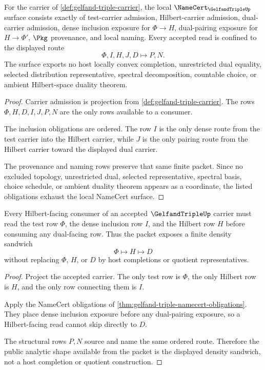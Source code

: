 \begin{theorem}
\label{thm:gelfand-triple-namecert-obligations}
For the carrier of \autoref{def:gelfand-triple-carrier}, the local $\NameCert_{\GelfandTripleUp}$ surface consists exactly of test-carrier admission, Hilbert-carrier admission, dual-carrier admission, dense inclusion exposure for $\Phi \to H$, dual-pairing exposure for $H \to \Phi'$, $\Pkg$ provenance, and local naming. Every accepted read is confined to the displayed route
$$
\Phi,I,H,J,D \longmapsto P,N .
$$
The surface exports no host locally convex completion, unrestricted dual equality, selected distribution representative, spectral decomposition, countable choice, or ambient Hilbert-space duality theorem.
\end{theorem}
\begin{proof}
Carrier admission is projection from \autoref{def:gelfand-triple-carrier}. The rows $\Phi,H,D,I,J,P,N$ are the only rows available to a consumer.

The inclusion obligations are ordered. The row $I$ is the only dense route from the test carrier into the Hilbert carrier, while $J$ is the only pairing route from the Hilbert carrier toward the displayed dual carrier.

The provenance and naming rows preserve that same finite packet. Since no excluded topology, unrestricted dual, selected representative, spectral basis, choice schedule, or ambient duality theorem appears as a coordinate, the listed obligations exhaust the local NameCert surface.
\end{proof}

\begin{theorem}
\label{thm:gelfand-triple-density-sandwich}
Every Hilbert-facing consumer of an accepted $\GelfandTripleUp$ carrier must read the test row $\Phi$, the dense inclusion row $I$, and the Hilbert row $H$ before consuming any dual-facing row. Thus the packet exposes a finite density sandwich
$$
\Phi \longmapsto H \longmapsto D
$$
without replacing $\Phi$, $H$, or $D$ by host completions or quotient representatives.
\end{theorem}
\begin{proof}
Project the accepted carrier. The only test row is $\Phi$, the only Hilbert row is $H$, and the only row connecting them is $I$.

Apply the NameCert obligations of \autoref{thm:gelfand-triple-namecert-obligations}. They place dense inclusion exposure before any dual-pairing exposure, so a Hilbert-facing read cannot skip directly to $D$.

The structural rows $P,N$ source and name the same ordered route. Therefore the public analytic shape available from the packet is the displayed density sandwich, not a host completion or quotient construction.
\end{proof}

